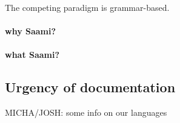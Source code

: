 \documentclass[a4paper,12pt]{article}
\begin{document}
The competing paradigm is grammar-based. 

\paragraph{why Saami?}

\paragraph{what Saami?}

\subsection{Urgency of documentation}
MICHA/JOSH: some info on our languages  
\end{document}
